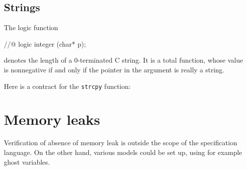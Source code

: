 \subsection{Strings}

\experimental
\begin{notimplementedenv}
The logic function
\begin{listing-nonumber}
//@ logic integer \strlen(char* p);
\end{listing-nonumber}
\end{notimplementedenv}
denotes the length of a 0-terminated C string. It is a total function,
whose value is nonnegative if and only if the pointer in the argument is
really a string.

\begin{example}
  Here is a contract for the \lstinline|strcpy| function:
  

\end{example}

\section{Memory leaks}

\experimental

Verification of absence of memory leak is outside the scope of the
specification language. On the other hand, various models could be set
up, using for example ghost variables.

